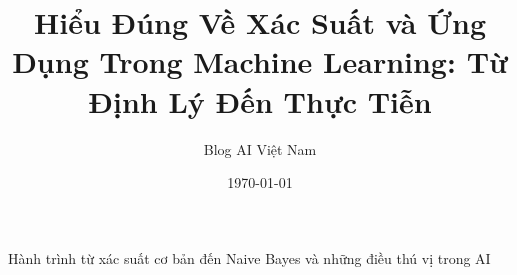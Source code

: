 \documentclass[12pt]{article}
\begin{document}
\title{Hiểu Đúng Về Xác Suất và Ứng Dụng Trong Machine Learning: Từ Định Lý Đến Thực Tiễn}
\author{Blog AI Việt Nam}
\date{\today}
\maketitle

\begin{center}
\large Hành trình từ xác suất cơ bản đến Naive Bayes và những điều thú vị trong AI
\end{center}





\end{document}
